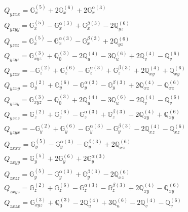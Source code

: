 \documentclass[fleqn,8pt,landscape]{jsarticle}
\begin{document}
\begin{align*}
& Q_{yzxx} = \mathbb{G}_{x}^{(5)} + 2 \mathbb{G}_{x}^{(6)} + 2 \mathbb{G}_{x}^{\alpha(3)} \\
& Q_{yzyy} = \mathbb{G}_{x}^{(5)} - \mathbb{G}_{x}^{\alpha(3)} + \mathbb{G}_{x}^{\beta(3)} - 2 \mathbb{Q}_{yz}^{(6)} \\
& Q_{yzzz} = \mathbb{G}_{x}^{(5)} - \mathbb{G}_{x}^{\alpha(3)} - \mathbb{G}_{x}^{\beta(3)} + 2 \mathbb{Q}_{yz}^{(6)} \\
& Q_{yzyz} = \mathbb{G}_{xyz}^{(3)} + \mathbb{Q}_{0}^{(3)} - 2 \mathbb{Q}_{u}^{(4)} - 3 \mathbb{Q}_{u}^{(6)} + 2 \mathbb{Q}_{v}^{(4)} - \mathbb{Q}_{v}^{(6)} \\
& Q_{yzzx} = - \mathbb{G}_{z}^{(2)} + \mathbb{G}_{z}^{(6)} - \mathbb{G}_{z}^{\alpha(3)} + \mathbb{G}_{z}^{\beta(3)} + 2 \mathbb{Q}_{xy}^{(4)} + \mathbb{Q}_{xy}^{(6)} \\
& Q_{yzxy} = \mathbb{G}_{y}^{(2)} + \mathbb{G}_{y}^{(6)} - \mathbb{G}_{y}^{\alpha(3)} - \mathbb{G}_{y}^{\beta(3)} + 2 \mathbb{Q}_{xz}^{(4)} - \mathbb{Q}_{xz}^{(6)} \\
& Q_{yzzy} = \mathbb{G}_{xyz}^{(3)} - \mathbb{Q}_{0}^{(3)} + 2 \mathbb{Q}_{u}^{(4)} - 3 \mathbb{Q}_{u}^{(6)} - 2 \mathbb{Q}_{v}^{(4)} - \mathbb{Q}_{v}^{(6)} \\
& Q_{yzxz} = \mathbb{G}_{z}^{(2)} + \mathbb{G}_{z}^{(6)} - \mathbb{G}_{z}^{\alpha(3)} + \mathbb{G}_{z}^{\beta(3)} - 2 \mathbb{Q}_{xy}^{(4)} + \mathbb{Q}_{xy}^{(6)} \\
& Q_{yzyx} = - \mathbb{G}_{y}^{(2)} + \mathbb{G}_{y}^{(6)} - \mathbb{G}_{y}^{\alpha(3)} - \mathbb{G}_{y}^{\beta(3)} - 2 \mathbb{Q}_{xz}^{(4)} - \mathbb{Q}_{xz}^{(6)} \\
& Q_{zxxx} = \mathbb{G}_{y}^{(5)} - \mathbb{G}_{y}^{\alpha(3)} - \mathbb{G}_{y}^{\beta(3)} + 2 \mathbb{Q}_{xz}^{(6)} \\
& Q_{zxyy} = \mathbb{G}_{y}^{(5)} + 2 \mathbb{G}_{y}^{(6)} + 2 \mathbb{G}_{y}^{\alpha(3)} \\
& Q_{zxzz} = \mathbb{G}_{y}^{(5)} - \mathbb{G}_{y}^{\alpha(3)} + \mathbb{G}_{y}^{\beta(3)} - 2 \mathbb{Q}_{xz}^{(6)} \\
& Q_{zxyz} = \mathbb{G}_{z}^{(2)} + \mathbb{G}_{z}^{(6)} - \mathbb{G}_{z}^{\alpha(3)} - \mathbb{G}_{z}^{\beta(3)} + 2 \mathbb{Q}_{xy}^{(4)} - \mathbb{Q}_{xy}^{(6)} \\
& Q_{zxzx} = \mathbb{G}_{xyz}^{(3)} + \mathbb{Q}_{0}^{(3)} - 2 \mathbb{Q}_{u}^{(4)} + 3 \mathbb{Q}_{u}^{(6)} - 2 \mathbb{Q}_{v}^{(4)} - \mathbb{Q}_{v}^{(6)} \\

\end{align*}
\end{document}
